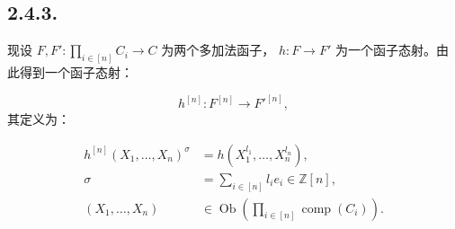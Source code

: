 \subsection*{2.4.3.}
现设
$F,F'\colon\prod_{i\in[n]}C_i\longrightarrow C$ 为两个多加法函子，
$h\colon F\longrightarrow F'$ 为一个函子态射。由此得到一个函子态射：

\begin{equation*}
  h^{[n]}\colon F^{[n]}\longrightarrow F'^{[n]},
\end{equation*}
其定义为：

\begin{equation}
  \begin{aligned}
    h^{[n]}(X_1,\ldots,X_n)^{\sigma}
      &=h(X_1^{l_1},\ldots,X_n^{l_n}),\\
    \sigma&=\sum_{i\in[n]}l_i e_i\in\mathbb Z[n],\\
    (X_1,\ldots,X_n)&\in
      \operatorname{Ob}\!\left(\prod_{i\in[n]}\operatorname{comp}(C_i)\right).
  \end{aligned}
  \tag{2.4.3.1}
\end{equation}
